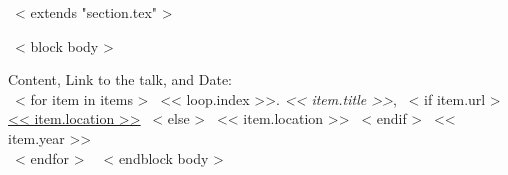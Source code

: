 ~< extends "section.tex" >~

~< block body >~

Content, Link to the talk, and Date: \\

  ~< for item in items >~
    << loop.index >>. \emph{<< item.title >>},
    ~< if item.url >~
      \href{<< item.url >>}{<< item.location >>}
    ~< else >~
      << item.location >>
  ~< endif >~
  \hfill << item.year >> \\
  ~< endfor >~
~< endblock body >~
